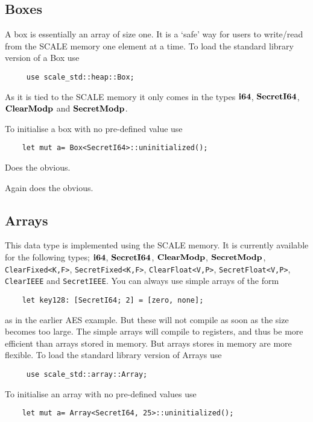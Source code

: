 

\subsection{Boxes}
A box is essentially an array of size one. It is a `safe' way for users
to write/read from the SCALE memory one element at a time.
To load the standard library version of a Box use
\begin{lstlisting}
     use scale_std::heap::Box;
\end{lstlisting}
As it is tied to the SCALE memory it only comes in the
types  $\mathbf{i64}$, $\mathbf{SecretI64}$, $\mathbf{ClearModp}$ and $\mathbf{SecretModp}$.

To initialise a box with no pre-defined value use
\begin{lstlisting}
    let mut a= Box<SecretI64>::uninitialized();
\end{lstlisting}

Does the obvious.

Again does the obvious.


\subsection{Arrays}
This data type is implemented using the SCALE memory.
It is currently available for the following types;
$\mathbf{i64}$, $\mathbf{SecretI64}$, $\mathbf{ClearModp}$, $\mathbf{SecretModp}$,
\verb|ClearFixed<K,F>|, \verb|SecretFixed<K,F>|,
\verb|ClearFloat<V,P>|, \verb|SecretFloat<V,P>|,
\verb|ClearIEEE| and \verb|SecretIEEE|.
You can always use simple arrays of the form
\begin{lstlisting}
    let key128: [SecretI64; 2] = [zero, none];
\end{lstlisting}
as in the earlier AES example. But these will not compile as
soon as the size becomes too large. The simple arrays will
compile to registers, and thus be more efficient than arrays
stored in memory. But arrays stores in memory are more flexible.
To load the standard library version of Arrays use
\begin{lstlisting}
     use scale_std::array::Array;
\end{lstlisting}

To initialise an array with no pre-defined values use
\begin{lstlisting}
    let mut a= Array<SecretI64, 25>::uninitialized();
\end{lstlisting}


